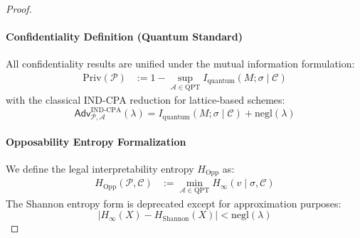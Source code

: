 \documentclass[preprint,12pt]{elsarticle}
\newcommand{\negl}{\mathrm{negl}}
\newcommand{\Adv}{\mathsf{Adv}}
\begin{document}
\begin{proof}
                \paragraph{Confidentiality Definition (Quantum Standard)}  
                All confidentiality results are unified under the mutual information formulation:
                \begin{align}
                    \mathrm{Priv}(\mathcal{P}) &:= 1 - \sup_{\mathcal{A} \in \mathrm{QPT}} I_{\text{quantum}}(M; \sigma \mid \mathcal{C}) \label{eq:priv_standard}
                \end{align}
                with the classical IND-CPA reduction for lattice-based schemes:
                \begin{equation}
                    \Adv^{\mathrm{IND}\mbox{-}\mathrm{CPA}}_{\mathcal{P},\mathcal{A}}(\lambda) = I_{\text{quantum}}(M; \sigma \mid \mathcal{C}) + \negl(\lambda)
                \end{equation}

                \paragraph{Opposability Entropy Formalization}  
                We define the legal interpretability entropy $H_{\text{Opp}}$ as:
                \begin{align}
                    H_{\text{Opp}}(\mathcal{P}, \mathcal{C}) &:= \min_{\mathcal{A} \in \mathrm{QPT}} H_\infty(v \mid \sigma, \mathcal{C}) \label{eq:hopp_standard}
                \end{align}
                The Shannon entropy form is deprecated except for approximation purposes:
                \begin{equation}
                    \left| H_\infty(X) - H_{\text{Shannon}}(X) \right| < \negl(\lambda)
                \end{equation}



\end{proof}
\end{document}

